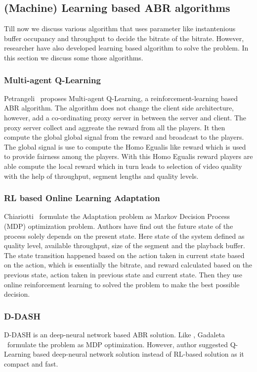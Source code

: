 \subsection{(Machine) Learning based ABR algorithms}
Till now we discuss various algorithm that uses parameter like instantenious buffer occupancy and throughput to decide the bitrate of the bitrate. However, researcher have also developed learning based algorithm to solve the problem. In this section we discuss some those algorithms.

\subsubsection{Multi-agent Q-Learning}
Petrangeli \etal\ proposes Multi-agent Q-Learning\cite{6838245}, a reinforcement-learning based ABR algorithm. The algorithm does not change the client side architecture, however, add a co-ordinating proxy server in between the server and client. The proxy server collect and aggreate the reward from all the players. It then compute the global global signal from the reward and broadcast to the players. The global signal is use to compute the Homo Egualis \cite{10.5555/1402298.1402344} like reward which is used to provide fairness among the players. With this Homo Egualis reward players are able compute the local reward which in turn leads to selection of video quality with the help of throughput, segment lengths and quality levels.

\subsubsection{RL based Online Learning Adaptation}
Chiariotti \etal\ formulate the Adaptation problem as Markov Decision Process (MDP)\cite{P-1066} optimization problem\cite{10.1145/2910017.2910603}. Authors have find out the future state of the process solely depends on the present state. Here state of the system defined as quality level, available throughput, size of the segment and the playback buffer. The state transition happened based on the action taken in current state based on the action, which is essentially the bitrate, and reward calculated based on the previous state, action taken in previous state and current state. Then they use online reinforcement learning to solved the problem to make the best possible decision.

\subsubsection{D-DASH \cite{8048013}}
D-DASH\cite{8048013} is an deep-neural network based ABR solution. Like \cite{10.1145/2910017.2910603}, Gadaleta \etal\ formulate the problem as MDP optimization. However, author suggested Q-Learning based deep-neural network solution instead of RL-based solution as it compact and fast.

